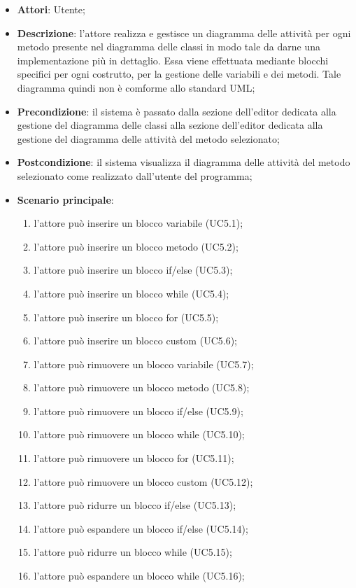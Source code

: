 \begin{itemize}
	\item \textbf{Attori}: Utente;
	\item \textbf{Descrizione}: l'attore realizza e gestisce un diagramma delle attività per ogni metodo presente nel diagramma delle classi in modo tale da darne una implementazione più in dettaglio. Essa viene effettuata mediante blocchi specifici per ogni costrutto, per la gestione delle variabili e dei metodi. Tale diagramma quindi non è comforme allo standard UML;
	\item \textbf{Precondizione}: il sistema è passato dalla sezione dell'editor dedicata alla gestione del diagramma delle classi alla sezione dell'editor dedicata alla gestione del diagramma delle attività del metodo selezionato;
	\item \textbf{Postcondizione}: il sistema visualizza il diagramma delle attività del metodo selezionato come realizzato dall'utente del programma;
	\item \textbf{Scenario principale}:
	\begin{enumerate}
		\item l'attore può inserire un blocco variabile (UC5.1);
		\item l'attore può inserire un blocco metodo (UC5.2);
		\item l'attore può inserire un blocco if/else (UC5.3);
		\item l'attore può inserire un blocco while (UC5.4);
		\item l'attore può inserire un blocco for (UC5.5);
		\item l'attore può inserire un blocco custom (UC5.6);
		\item l'attore può rimuovere un blocco variabile (UC5.7);
		\item l'attore può rimuovere un blocco metodo (UC5.8);
		\item l'attore può rimuovere un blocco if/else (UC5.9);
		\item l'attore può rimuovere  un blocco while (UC5.10);
		\item l'attore può rimuovere un blocco for (UC5.11);
		\item l'attore può rimuovere un blocco custom (UC5.12);
		\item l'attore può ridurre un blocco if/else (UC5.13);
		\item l'attore può espandere un blocco if/else (UC5.14);
		\item l'attore può ridurre un blocco while (UC5.15);
		\item l'attore può espandere un blocco while (UC5.16);

\end{enumerate}
\end{itemize}

